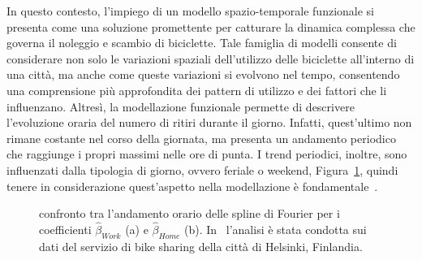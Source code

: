 \par In questo contesto, l'impiego di un modello spazio-temporale funzionale si presenta come una soluzione promettente per catturare la dinamica complessa che governa il noleggio e scambio di biciclette. Tale famiglia di modelli consente di considerare non solo le variazioni spaziali dell'utilizzo delle biciclette all'interno di una città, ma anche come queste variazioni si evolvono nel tempo, consentendo una comprensione più approfondita dei pattern di utilizzo e dei fattori che li influenzano. Altresì, la modellazione funzionale permette di descrivere l'evoluzione oraria del numero di ritiri durante il giorno. Infatti, quest'ultimo non rimane costante nel corso della giornata, ma presenta un andamento periodico che raggiunge i propri massimi nelle ore di punta. I trend periodici, inoltre, sono influenzati dalla tipologia di giorno, ovvero feriale o weekend, Figura~\ref{trend_paper_Otto}, quindi tenere in considerazione quest'aspetto nella modellazione è fondamentale~\citep{paper_bike_sharing_Otto}.

\begin{figure}[htpb]
	\centering
	\quad
	\quad
	\caption[Confronto tra l'andamento orario delle spline di Fourier per i coefficienti $\hat{\beta}_{Work}$ (a) e $\hat{\beta}_{Home}$ (b)]{confronto tra l'andamento orario delle spline di Fourier per i coefficienti $\hat{\beta}_{Work}$ (a) e $\hat{\beta}_{Home}$ (b). In~\cite{paper_bike_sharing_Otto} l'analisi è stata condotta sui dati del servizio di bike sharing della città di Helsinki, Finlandia.}
	\label{trend_paper_Otto}
\end{figure}

